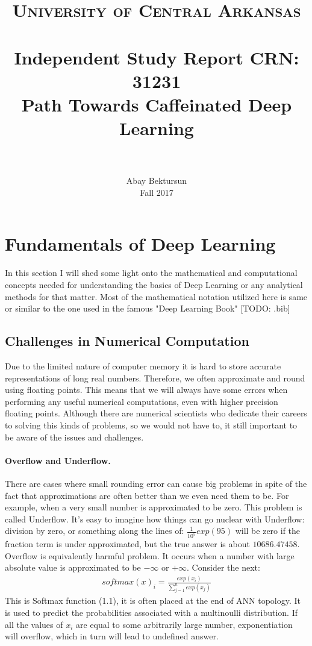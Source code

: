 \documentclass[paper=a4, fontsize=11pt]{scrartcl}
\title{
	\usefont{OT1}{bch}{b}{n}
	\normalfont \normalsize \textsc{University of Central Arkansas} \\ [25pt]
	\horrule{0.5pt} \\[0.4cm]
	\large Independent Study Report CRN: 31231 \\
	\huge Path Towards Caffeinated Deep Learning \\
	\horrule{2pt} \\[0.5cm]
}
\author{
	\normalfont 			\normalsize
	Abay Bektursun\\[-3pt]	\normalsize
	Fall 2017\\[-3pt]	\normalsize
}
\date{}
\numberwithin{equation}{section}		%
\numberwithin{figure}{section}			%
\numberwithin{table}{section}			%
\begin{document}
	
	\maketitle
	\section{Fundamentals of Deep Learning}
		In this section I will shed some light onto the mathematical and computational concepts needed for understanding the basics of Deep Learning or any analytical methods for that matter. Most of the mathematical notation utilized here is same or similar to the one used in the famous "Deep Learning Book" [TODO: .bib]	
	
	\subsection{Challenges in Numerical Computation}
		Due to the limited nature of computer memory it is hard to store accurate representations of long real numbers. Therefore, we often approximate and round using floating points. This means that we will always have some errors when performing any useful numerical computations, even with higher precision floating points. Although there are numerical scientists who dedicate their careers to solving this kinds of problems, so we would not have to, it still important to be aware of the issues and challenges. 
	\paragraph{Overflow and Underflow.}
	There are cases where small rounding error can cause big problems in spite of the fact that approximations are often better than we even need them to be. For example, when a very small number is approximated to be zero. This problem is called Underflow. It's easy to imagine how things can go nuclear with Underflow: division by zero, or something along the lines of: $ \frac{1}{10^5}exp(95) $ will be zero if the fraction term is under approximated, but the true answer is about $ 10686.47458 $. Overflow is equivalently harmful problem. It occurs when a number with large absolute value is approximated to be $-\infty $ or $+\infty $. Consider the next: 
	\begin{align}
	softmax(x)_{i} = \frac{exp(x_{i})}{\sum_{j=1}^{n}exp(x_{j})}
	\end{align}
	This is Softmax function (1.1), it is often placed at the end of ANN topology. It is used to predict the probabilities associated with a multinoulli distribution. If all the values of $ x_{i} $ are equal to some arbitrarily large number, exponentiation will overflow, which in turn will lead to undefined answer. 
\end{document}
